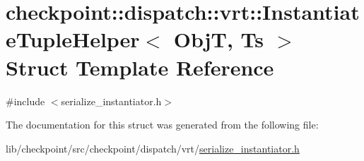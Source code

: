 \hypertarget{structcheckpoint_1_1dispatch_1_1vrt_1_1_instantiate_tuple_helper}{}\section{checkpoint\+:\+:dispatch\+:\+:vrt\+:\+:Instantiate\+Tuple\+Helper$<$ ObjT, Ts $>$ Struct Template Reference}
\label{structcheckpoint_1_1dispatch_1_1vrt_1_1_instantiate_tuple_helper}


{\ttfamily \#include $<$serialize\+\_\+instantiator.\+h$>$}



The documentation for this struct was generated from the following file\+:\begin{DoxyCompactItemize}
\item 
lib/checkpoint/src/checkpoint/dispatch/vrt/\hyperlink{serialize__instantiator_8h}{serialize\+\_\+instantiator.\+h}\end{DoxyCompactItemize}
